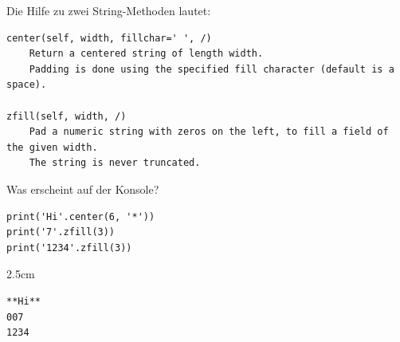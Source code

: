\question[3]
Die Hilfe zu zwei String-Methoden lautet:
\begin{lstlisting}[language={}]
center(self, width, fillchar=' ', /)
    Return a centered string of length width.
    Padding is done using the specified fill character (default is a space).

zfill(self, width, /)
    Pad a numeric string with zeros on the left, to fill a field of the given width.
    The string is never truncated.
\end{lstlisting}
Was erscheint auf der Konsole?
\begin{lstlisting}
print('Hi'.center(6, '*'))
print('7'.zfill(3))
print('1234'.zfill(3))
\end{lstlisting}
\begin{solutionbox}{2.5cm}
\begin{lstlisting}[language={}]
**Hi**
007
1234
\end{lstlisting}
\end{solutionbox}
